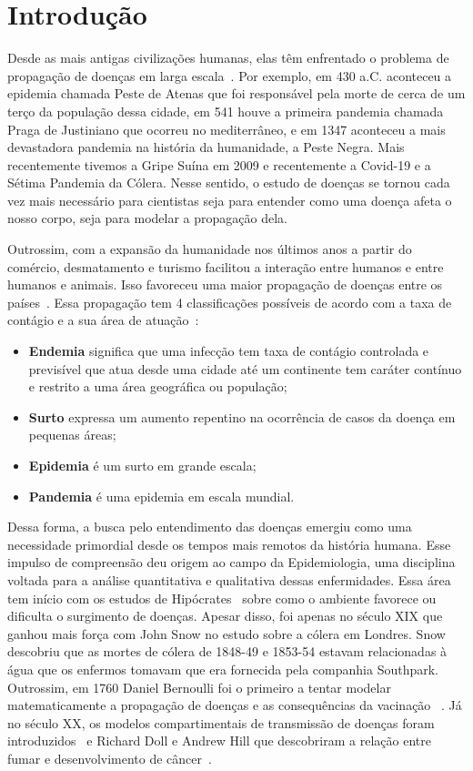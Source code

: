 \chapter{Introdução}
Desde as mais antigas civilizações humanas, elas têm enfrentado o problema de propagação de doenças em larga escala~\cite{historic}. 
Por exemplo, em 
430 a.C. aconteceu a epidemia chamada Peste de Atenas que foi responsável pela morte de cerca de 
um terço  da população dessa cidade, em 
541 houve a primeira pandemia chamada Praga de Justiniano que ocorreu no mediterrâneo, 
e 
em 1347 aconteceu a mais devastadora pandemia na história da humanidade, a Peste Negra. Mais recentemente tivemos a Gripe Suína em 2009 e recentemente a Covid-19 e a Sétima Pandemia da Cólera. Nesse sentido, o estudo de 
doenças se tornou cada vez mais necessário para cientistas seja para entender como uma 
doença afeta o nosso corpo, seja para modelar a propagação dela.

Outrossim, com a expansão da humanidade nos últimos anos a partir do comércio, desmatamento e turismo facilitou a interação entre humanos e entre humanos e animais. Isso favoreceu uma maior propagação de doenças entre os países~\cite{area}. Essa propagação tem 4 classificações possíveis de acordo com a taxa de contágio e a sua área de atuação~\cite{whats}:

\begin{itemize}
  \item \textbf{Endemia} significa que uma infecção tem taxa de contágio controlada e previsível que atua desde uma cidade até um continente tem caráter contínuo e restrito a uma área geográfica ou população;
  \item \textbf{Surto} expressa um aumento repentino na ocorrência de casos da doença em pequenas áreas;
  \item \textbf{Epidemia} é um surto em grande escala;
  \item \textbf{Pandemia} é uma epidemia em escala mundial.
\end{itemize}

Dessa forma, a busca pelo entendimento das doenças emergiu como uma necessidade primordial desde os tempos mais remotos da história humana. Esse impulso de compreensão deu origem ao campo da Epidemiologia, uma disciplina voltada para a análise quantitativa e qualitativa dessas enfermidades. Essa área tem início com os estudos de Hipócrates~\cite{epidemiologia01} sobre como o ambiente 
favorece ou dificulta o surgimento de doenças. Apesar disso, foi apenas no século XIX que ganhou mais força com John Snow no estudo sobre a cólera em Londres. 
Snow descobriu que as mortes de cólera de 1848-49 e 1853-54 estavam relacionadas à água que os enfermos tomavam que era fornecida pela companhia Southpark. Outrossim, em 1760 Daniel Bernoulli foi o primeiro a tentar modelar 
matematicamente a propagação de doenças 
e as consequências da vacinação ~\cite{bernoulli2004attempt,Dietz2002}.
Já no século XX, os modelos compartimentais de transmissão de doenças foram introduzidos~\cite{kermack1927contribution} e 
 Richard Doll e Andrew Hill que descobriram a relação entre fumar e desenvolvimento de câncer~\cite{Doll1950}. 

